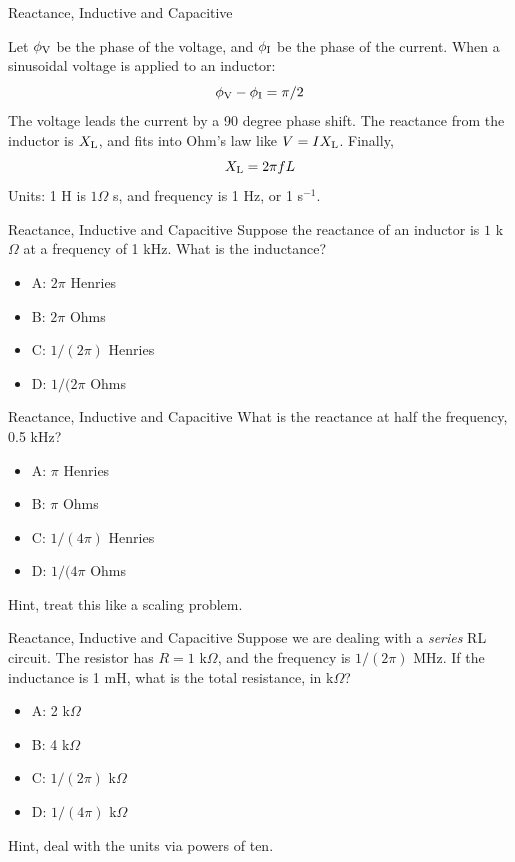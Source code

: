 \documentclass{beamer}
\begin{document}
\begin{frame}{Reactance, Inductive and Capacitive}
\begin{tcolorbox}[colback=white,colframe=black!40!black,title=Reactance and Inductors]
\alert{Let $\phi_{\rm V}$ be the phase of the voltage, and $\phi_{\rm I}$ be the phase of the current.  When a sinusoidal voltage is applied to an inductor:
\begin{equation}
\phi_{\rm V} - \phi_{\rm I} = \pi/2
\end{equation}
The voltage leads the current by a 90 degree phase shift.  The reactance from the inductor is $X_{\rm L}$, and fits into Ohm's law like $V = I X_{\rm L}$.  Finally,
\begin{equation}
X_{\rm L} = 2\pi f L
\end{equation}
Units: 1 H is $1 \Omega$ s, and frequency is 1 Hz, or 1 s$^{-1}$.}
\end{tcolorbox}
\end{frame}

\begin{frame}{Reactance, Inductive and Capacitive}
Suppose the reactance of an inductor is $1$ k$\Omega$ at a frequency of 1 kHz.  What is the inductance?
\begin{itemize}
\item A: $2\pi$ Henries
\item B: $2\pi$ Ohms
\item C: $1/(2\pi)$ Henries
\item D: $1/(2\pi$ Ohms
\end{itemize}
\end{frame}

\begin{frame}{Reactance, Inductive and Capacitive}
What is the reactance at half the frequency, 0.5 kHz?
\begin{itemize}
\item A: $\pi$ Henries
\item B: $\pi$ Ohms
\item C: $1/(4\pi)$ Henries
\item D: $1/(4\pi$ Ohms
\end{itemize}
\footnotesize
Hint, treat this like a scaling problem.
\end{frame}

\begin{frame}{Reactance, Inductive and Capacitive}
Suppose we are dealing with a \textit{series} RL circuit.  The resistor has $R = 1$ k$\Omega$, and the frequency is $1/(2\pi)$ MHz.  If the inductance is 1 mH, what is the total resistance, in k$\Omega$?
\begin{itemize}
\item A: 2 k$\Omega$
\item B: 4 k$\Omega$
\item C: $1/(2\pi)$ k$\Omega$
\item D: $1/(4\pi)$ k$\Omega$
\end{itemize}
\footnotesize
Hint, deal with the units via powers of ten.
\end{frame}
\end{document}
